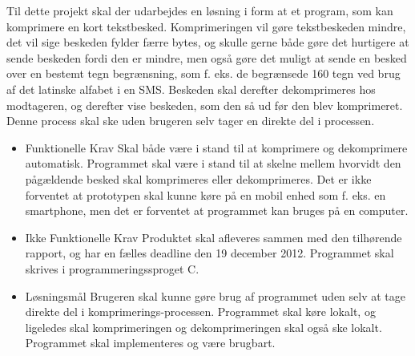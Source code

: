 Til dette projekt skal der udarbejdes en løsning i form at et program, som kan komprimere en kort tekstbesked. Komprimeringen vil gøre tekstbeskeden mindre, det vil sige beskeden fylder færre bytes, og skulle gerne både gøre det hurtigere at sende beskeden fordi den er mindre, men også gøre det muligt at sende en besked over en bestemt tegn begrænsning, som f. eks. de begrænsede 160 tegn ved brug af det latinske alfabet i en SMS. Beskeden skal derefter dekomprimeres hos modtageren, og derefter vise beskeden, som den så ud før den blev komprimeret. Denne process skal ske uden brugeren selv tager en direkte del i processen.

\begin {itemize}
\item Funktionelle Krav
\subitem Skal både være i stand til at komprimere og dekomprimere automatisk.
\subitem Programmet skal være i stand til at skelne mellem hvorvidt den pågældende besked skal komprimeres eller dekomprimeres.
\subitem Det er ikke forventet at prototypen skal kunne køre på en mobil enhed som f. eks. en smartphone, men det er forventet at programmet kan bruges på en computer.

\item Ikke Funktionelle Krav
\subitem Produktet skal afleveres sammen med den tilhørende rapport, og har en fælles deadline den 19 december 2012.
\subitem Programmet skal skrives i programmeringssproget C.

\item Løsningsmål
\subitem Brugeren skal kunne gøre brug af programmet uden selv at tage direkte del i komprimerings-processen.
\subitem Programmet skal køre lokalt, og ligeledes skal komprimeringen og dekomprimeringen skal også ske lokalt.
\subitem Programmet skal implementeres og være brugbart.
\end{itemize}